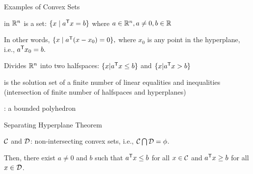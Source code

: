 \documentclass[handout,fleqn,aspectratio=169]{beamer}
\begin{document}
\begin{frame}{Examples of Convex Sets}

\plitemsep 0.1in

\bci 

\item {} in ${\mathbb R}^{n}$ is a set:
$\{x \mid {a}^{\mathsf{T}}x=b\}$ where $a\in{\mathbb R}^{n}, a\neq 0, b\in{\mathbb R}$

In other words, $\{ x \mid {a}^{\mathsf{T}}(x-x_0) =0\},$ where $x_0$ is any point in
the hyperplane, i.e., ${a}^{\mathsf{T}} x_0 = b.$

{
\item Divides ${\mathbb R}^{n}$ into two {\blue halfspaces}: 
$\{x|{a}^{\mathsf{T}}x\leq b\}$ and $\{x|{a}^{\mathsf{T}}x>b\}$
}
{
\vspace{-0.3cm}
}

\item {} is the solution set of a finite
number of linear equalities and inequalities (intersection of
finite number of halfspaces and hyperplanes)

\item {}: a bounded polyhedron

\eci
\end{frame}

\begin{frame}{Separating Hyperplane Theorem}


\plitemsep 0.1in

\bci 

\item $\mathcal C$ and $\mathcal D$: non-intersecting convex sets, i.e., 
$\mathcal C\bigcap \mathcal D=\phi$. 

\item Then, there exist $a\neq 0$ and $b$ such that
${a}^{\mathsf{T}}x\leq b$ for all $x\in \mathcal C$ and ${a}^{\mathsf{T}}x\geq b$ for all $x\in
\mathcal D$.

\eci
\end{frame}
\end{document}
